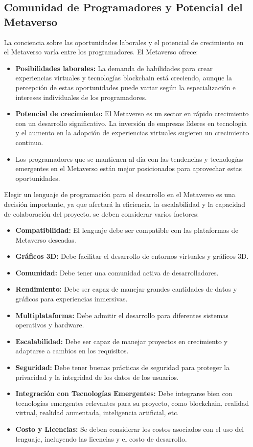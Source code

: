\documentclass[a4paper,10pt]{article}
\begin{document}
		\subsection{Comunidad de Programadores y Potencial del Metaverso}
		{\normalsize La conciencia sobre las oportunidades laborales y el potencial de crecimiento en el Metaverso varía entre los programadores. El Metaverso ofrece:
			\begin{itemize}
				\item \textbf{Posibilidades laborales:} La demanda de habilidades para crear experiencias virtuales y tecnologías blockchain está creciendo, aunque la percepción de estas oportunidades puede variar según la especialización e intereses individuales de los programadores.
				\item \textbf{Potencial de crecimiento:} El Metaverso es un sector en rápido crecimiento con un desarrollo significativo. La inversión de empresas líderes en tecnología y el aumento en la adopción de experiencias virtuales sugieren un crecimiento continuo.
				\item Los programadores que se mantienen al día con las tendencias y tecnologías emergentes en el Metaverso están mejor posicionados para aprovechar estas oportunidades.
			\end{itemize}
			Elegir un lenguaje de programación para el desarrollo en el Metaverso es una decisión importante, ya que afectará la eficiencia, la escalabilidad y la capacidad de colaboración del proyecto. se deben considerar varios factores:
			\begin{itemize}
				\item \textbf{Compatibilidad:} El lenguaje debe ser compatible con las plataformas de Metaverso deseadas.
				\item \textbf{Gráficos 3D:} Debe facilitar el desarrollo de entornos virtuales y gráficos 3D.
				\item \textbf{Comunidad:} Debe tener una comunidad activa de desarrolladores.
				\item \textbf{Rendimiento:} Debe ser capaz de manejar grandes cantidades de datos y gráficos para experiencias inmersivas.
				\item \textbf{Multiplataforma:} Debe admitir el desarrollo para diferentes sistemas operativos y hardware.
				\item \textbf{Escalabilidad:} Debe ser capaz de manejar proyectos en crecimiento y adaptarse a cambios en los requisitos.
				\item \textbf{Seguridad:} Debe tener buenas prácticas de seguridad para proteger la privacidad y la integridad de los datos de los usuarios.		
				\item \textbf{Integración con Tecnologías Emergentes:} Debe integrarse bien con tecnologías emergentes relevantes para su proyecto, como blockchain, realidad virtual, realidad aumentada, inteligencia artificial, etc.
				\item \textbf{Costo y Licencias:} Se deben considerar los costos asociados con el uso del lenguaje, incluyendo las licencias y el costo de desarrollo.
			\end{itemize}}
\end{document}
